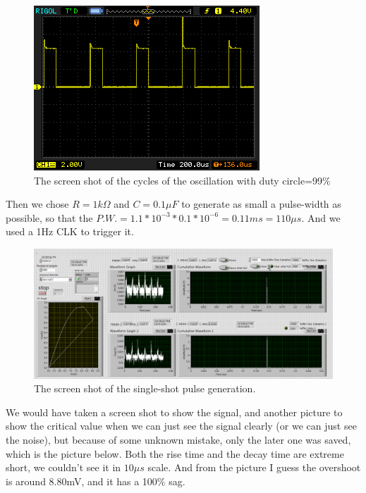 \documentclass[11pt]{article}
\begin{document}
\begin{figure}[H]
 \begin{center}
  \includegraphics[width=\linewidth/2]{act5_13}
  \caption{The screen shot of the cycles of the oscillation with duty circle=99\%}
  \label{fig:act5_13}
 \end{center}
\end{figure}

Then we chose $R=1k\Omega$ and $C=0.1\mu F$ to generate as small a pulse-width as possible, so that the $P.W.=1.1*10^{-3}*0.1*10^{-6}=0.11ms=110\mu s$. And we used a 1Hz CLK to trigger it.

\begin{figure}[H]
 \begin{center}
  \includegraphics[width=\linewidth/2]{act5_2}
  \caption{The screen shot of the single-shot pulse generation.}
  \label{fig:act5_2}
 \end{center}
\end{figure}

We would have taken a screen shot to show the signal, and another picture to show the critical value when we can just see the signal clearly (or we can just see the noise), but because of some unknown mistake, only the later one was saved, which is the picture below. Both the rise time and the decay time are extreme short, we couldn't see it in $10\mu s$ scale. And from the picture I guess the overshoot is around 8.80mV, and it has a 100\% sag.
\end{document}
